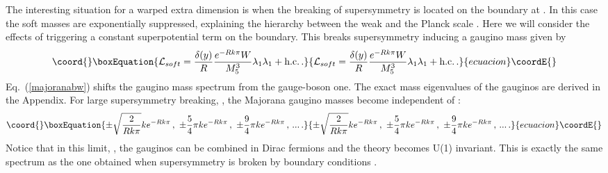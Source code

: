 \documentclass[a4paper,12pt]{article}
\begin{document}
The interesting situation for a warped extra dimension is when
the breaking of supersymmetry is located on the boundary at \coordHE{}.
In this case the soft masses are  exponentially suppressed,
explaining the hierarchy between the weak and the Planck scale 
\cite{gp,gp2,lsp,dkkls}.
Here we will consider
the effects of triggering a constant 
superpotential
term \coordHE{} on the \coordHE{} boundary. 
This breaks supersymmetry
 inducing a gaugino mass  given by
\begin{equation}\coord{}\boxEquation{
{\cal L}_{soft}=\frac{\delta(y)}{R}\frac{e^{-Rk\pi }W}
{M^3_5}\lambda_1\lambda_1+\text{h.c.}\, .
\label{majoranabw}
}{
{\cal L}_{soft}=\frac{\delta(y)}{R}\frac{e^{-Rk\pi }W}
{M^3_5}\lambda_1\lambda_1+\text{h.c.}\, .
}{ecuacion}\coordE{}\end{equation}
Eq.~(\ref{majoranabw}) shifts the gaugino mass spectrum
from the gauge-boson one. 
The exact mass eigenvalues \coordHE{} of 
the gauginos are derived in the Appendix.
For large supersymmetry breaking, \coordHE{}, 
the Majorana gaugino masses become independent of \coordHE{}: 
\begin{equation}\coord{}\boxEquation{
 \pm \sqrt{\frac{2}{Rk\pi}}ke^{-Rk\pi}\, ,\
\pm \frac{5}{4}\pi ke^{-Rk\pi}\, ,\
\pm \frac{9}{4}\pi ke^{-Rk\pi}\, ,\, ...\, .
}{
 \pm \sqrt{\frac{2}{Rk\pi}}ke^{-Rk\pi}\, ,\
\pm \frac{5}{4}\pi ke^{-Rk\pi}\, ,\
\pm \frac{9}{4}\pi ke^{-Rk\pi}\, ,\, ...\, .
}{ecuacion}\coordE{}\end{equation}
Notice that in 
this limit, \coordHE{},
the gauginos can be combined in  Dirac fermions
and the theory becomes U(1)\coordHE{} invariant.
This  is exactly the same spectrum 
as the one obtained when supersymmetry is broken by
boundary conditions \cite{gp2}.
\end{document}
